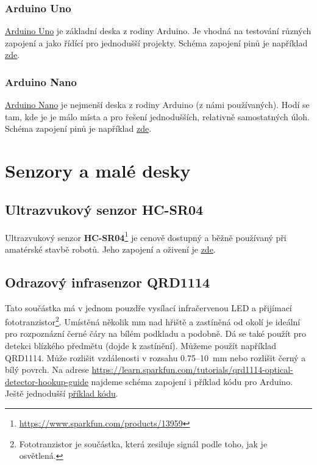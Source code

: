 \subsubsection*{Arduino Uno} \label{uno} 

\href{https://store.arduino.cc/arduino-uno-rev3}{Arduino Uno} je základní deska z rodiny Arduino. Je vhodná na testování různých zapojení a jako řídící pro jednodušší projekty.
Schéma zapojení pinů je například \href{http://forum.arduino.cc/index.php?topic=146315.0}{zde}.

\subsubsection*{Arduino Nano} \label{nano} 

\href{https://store.arduino.cc/usa/arduino-nano}{Arduino Nano} je nejmenší deska z rodiny Arduino (z námi používaných). 
Hodí se tam, kde je je málo místa a pro řešení jednodušších, relativně samostatných úloh. 
Schéma zapojení pinů je například \href{https://simba-os.readthedocs.io/en/latest/_images/arduino-nano-pinout.png}{zde}.

\section{Senzory a malé desky}

\label{hcsr04} \subsection{Ultrazvukový senzor HC-SR04} 

Ultrazvukový senzor {\bf HC-SR04}\footnote{\url{https://www.sparkfun.com/products/13959}}  je cenově dostupný a běžně používaný při amatérské stavbě robotů. 
Jeho zapojení a oživení je 
  \href{https://randomnerdtutorials.com/complete-guide-for-ultrasonic-sensor-hc-sr04/}{zde}.

\subsection{Odrazový infrasenzor QRD1114}

  \label{qrd1114} Tato součástka má v jednom pouzdře vysílací infračervenou LED a přijímací fototranzistor\footnote{Fototranzistor je součástka, která zesiluje signál podle toho, jak je osvětlená.}. Umístěná několik mm nad hřiště a zastíněná od okolí je ideální pro rozpoznázní  černé čáry na bílém podkladu a podobně. Dá se také použít pro detekci blízkého předmětu (dojde k zastínění).
Můžeme použít například QRD1114. Může rozlišit vzdálenosti v rozsahu 0.75--10~mm nebo rozlišit černý a bílý povrch.  
Na adrese
\url{https://learn.sparkfun.com/tutorials/qrd1114-optical-detector-hookup-guide} najdeme schéma zapojení i příklad kódu pro Arduino. Ještě jednodušší \hyperref[prog:qrd1114]{příklad kódu}.

